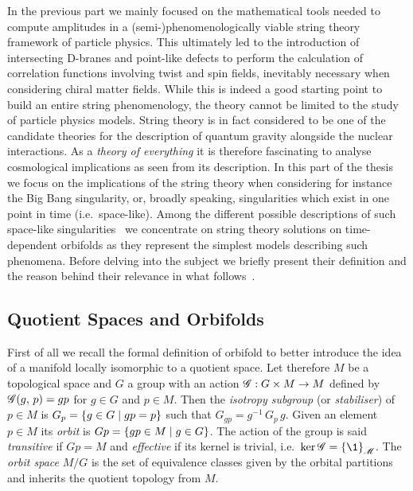 In the previous part we mainly focused on the mathematical tools needed to compute amplitudes in a (semi-)phenomenologically viable string theory framework of particle physics.
This ultimately led to the introduction of intersecting D-branes and point-like defects to perform the calculation of correlation functions involving twist and spin fields, inevitably necessary when considering chiral matter fields.
While this is indeed a good starting point to build an entire string phenomenology, the theory cannot be limited to the study of particle physics models.
String theory is in fact considered to be one of the candidate theories for the description of quantum gravity alongside the nuclear interactions.
As a \emph{theory of everything} it is therefore fascinating to analyse cosmological implications as seen from its description.
In this part of the thesis we focus on the implications of the string theory when considering for instance the Big Bang singularity, or, broadly speaking, singularities which exist in one point in time (i.e.\ space-like).\footnotemark{}
Among the different possible descriptions of such space-like singularities~\cite{Berkooz:2007:ShortReviewTime} we concentrate on string theory solutions on time-dependent orbifolds as they represent the simplest models describing such phenomena.
Before delving into the subject we briefly present their definition and the reason behind their relevance in what follows~\cite{CaramelloJr:2019:IntroductionOrbifolds,Bachas:2002:NullBraneIntersections,Bachas:2003:RelativisticStringPulse}.


\subsection{Quotient Spaces and Orbifolds}

First of all we recall the formal definition of orbifold to better introduce the idea of a manifold locally isomorphic to a quotient space.
Let therefore $M$ be a topological space and $G$ a group with an action $\mathscr{G}: G \times M \to M$ defined by $\mathscr{G}(g,\, p) = g p$ for $g \in G$ and $p \in M$.
Then the \emph{isotropy subgroup} (or \emph{stabiliser}) of $p \in M$ is $G_p = \qty{ g \in G \mid g p = p }$ such that $G_{gp} = g^{-1}\, G_p\, g$.
Given an element $p \in M$ its \emph{orbit} is $Gp = \qty{ gp \in M \mid g \in G }$.
The action of the group is said \emph{transitive} if $Gp = M$ and \emph{effective} if its kernel is trivial, i.e.\ $\ker{\ccG} = \qty{ \1 }_{\ccM}$.
The \emph{orbit space} $M / G$ is the set of equivalence classes given by the orbital partitions and inherits the quotient topology from $M$.

